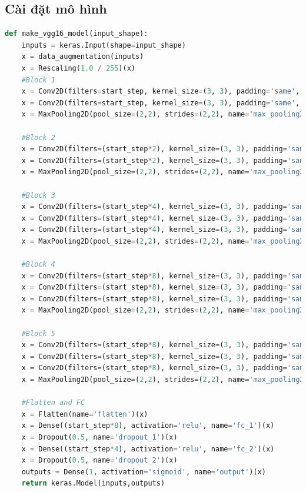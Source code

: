 \subsection{Cài đặt mô hình}
\begin{lstlisting}[language=Python]
def make_vgg16_model(input_shape):
	inputs = keras.Input(shape=input_shape)
	x = data_augmentation(inputs)
	x = Rescaling(1.0 / 255)(x)
	#Block 1
	x = Conv2D(filters=start_step, kernel_size=(3, 3), padding='same', activation='relu', name='conv1_1')(x)
	x = Conv2D(filters=start_step, kernel_size=(3, 3), padding='same', activation='relu', name='conv1_2')(x)
	x = MaxPooling2D(pool_size=(2,2), strides=(2,2), name='max_pooling2d_1')(x)
	
	#Block 2
	x = Conv2D(filters=(start_step*2), kernel_size=(3, 3), padding='same', activation='relu', name='conv2_1')(x)
	x = Conv2D(filters=(start_step*2), kernel_size=(3, 3), padding='same', activation='relu', name='conv2_2')(x)
	x = MaxPooling2D(pool_size=(2,2), strides=(2,2), name='max_pooling2d_2')(x)
	
	#Block 3
	x = Conv2D(filters=(start_step*4), kernel_size=(3, 3), padding='same', activation='relu', name='conv3_1')(x)
	x = Conv2D(filters=(start_step*4), kernel_size=(3, 3), padding='same', activation='relu', name='conv3_2')(x)
	x = Conv2D(filters=(start_step*4), kernel_size=(3, 3), padding='same', activation='relu', name='conv3_3')(x)
	x = MaxPooling2D(pool_size=(2,2), strides=(2,2), name='max_pooling2d_3')(x)
	
	#Block 4
	x = Conv2D(filters=(start_step*8), kernel_size=(3, 3), padding='same', activation='relu', name='conv4_1')(x)
	x = Conv2D(filters=(start_step*8), kernel_size=(3, 3), padding='same', activation='relu', name='conv4_2')(x)
	x = Conv2D(filters=(start_step*8), kernel_size=(3, 3), padding='same', activation='relu', name='conv4_3')(x)
	x = MaxPooling2D(pool_size=(2,2), strides=(2,2), name='max_pooling2d_4')(x)
	
	#Block 5
	x = Conv2D(filters=(start_step*8), kernel_size=(3, 3), padding='same', activation='relu', name='conv5_1')(x)
	x = Conv2D(filters=(start_step*8), kernel_size=(3, 3), padding='same', activation='relu', name='conv5_2')(x)
	x = Conv2D(filters=(start_step*8), kernel_size=(3, 3), padding='same', activation='relu', name='conv5_3')(x)
	x = MaxPooling2D(pool_size=(2,2), strides=(2,2), name='max_pooling2d_5')(x)
	
	#Flatten and FC
	x = Flatten(name='flatten')(x)
	x = Dense((start_step*8), activation='relu', name='fc_1')(x)
	x = Dropout(0.5, name='dropout_1')(x)
	x = Dense((start_step*4), activation='relu', name='fc_2')(x)
	x = Dropout(0.5, name='dropout_2')(x)
	outputs = Dense(1, activation='sigmoid', name='output')(x)
	return keras.Model(inputs,outputs)			
\end{lstlisting}

	 
	 
